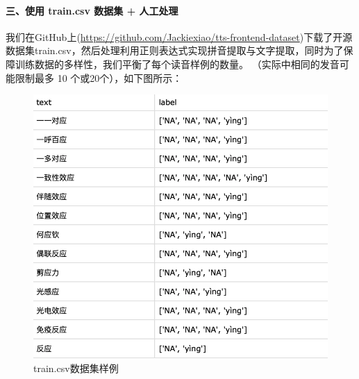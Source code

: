 \documentclass[12pt,hyperref,a4paper,UTF8]{ctexart}
\begin{document}
\paragraph{三、使用 train.csv 数据集 + 人工处理}
\indent 我们在GitHub上(\url{https://github.com/Jackiexiao/tts-frontend-dataset})下载了开源数据集train.csv，然后处理利用正则表达式实现拼音提取与文字提取，同时为了保障训练数据的多样性，我们平衡了每个读音样例的数量。 （实际中相同的发音可能限制最多 10 个或20个），如下图所示：
\begin{figure}[H]%
    \centering
    \includegraphics[width=0.5\linewidth]{figures/image2.png}
    \caption{train.csv数据集样例}
    \label{fig:enter-label}
\end{figure}
\end{document}
